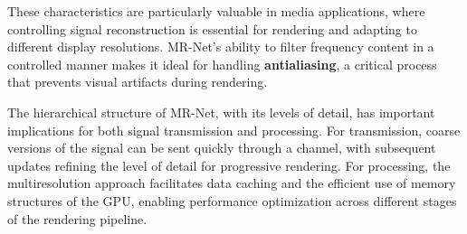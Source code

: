 These characteristics are particularly valuable in media applications, where controlling signal reconstruction is essential for rendering and adapting to different display resolutions. MR-Net's ability to filter frequency content in a controlled manner makes it ideal for handling \textbf{antialiasing}, a critical process that prevents visual artifacts during rendering.

The hierarchical structure of MR-Net, with its levels of detail, has important implications for both signal transmission and processing. For transmission, coarse versions of the signal can be sent quickly through a channel, with subsequent updates refining the level of detail for progressive rendering. For processing, the multiresolution approach facilitates data caching and the efficient use of memory structures of the GPU, enabling performance optimization across different stages of the rendering pipeline.



